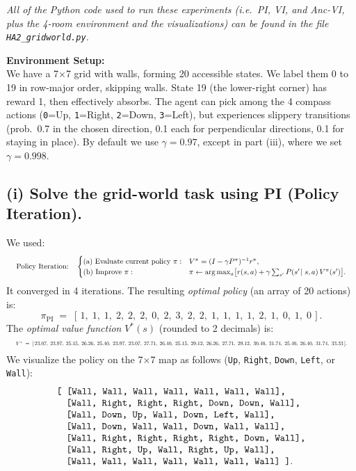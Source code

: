 \emph{All of the Python code used to run these experiments (i.e.\ PI, VI, and Anc-VI, 
plus the 4-room environment and the visualizations) can be found in the file 
\texttt{HA2\_gridworld.py}.}

\bigskip

\noindent
\textbf{Environment Setup:}\\
We have a 7$\times$7 grid with walls, forming 20 accessible states. 
We label them 0 to 19 in row-major order, skipping walls. 
State 19 (the lower-right corner) has reward 1, then effectively absorbs. 
The agent can pick among the 4 compass actions 
(\texttt{0}=Up, \texttt{1}=Right, \texttt{2}=Down, \texttt{3}=Left), 
but experiences slippery transitions (prob.\ 0.7 in the chosen direction, 0.1 each 
for perpendicular directions, 0.1 for staying in place). 
By default we use $\gamma=0.97$, except in part (iii), where we set $\gamma=0.998$.

\subsection*{(i) Solve the grid-world task using PI (Policy Iteration).}

\noindent
We used:
\[
  \resizebox{\textwidth}{!}{
  $\text{Policy Iteration:}\quad
  \begin{cases}
    \text{(a) Evaluate current policy }\pi: 
      & V^\pi = (I - \gamma P^\pi)^{-1} r^\pi,\\
    \text{(b) Improve } \pi: & 
      \pi \leftarrow \arg\max_{a} 
        \bigl[r(s,a)+\gamma\sum_{s'}P(s'\!\mid s,a)\,V^\pi(s')\bigr].
  \end{cases}$
  }
\]
It converged in 4 iterations. 
The resulting \emph{optimal policy} (an array of 20 actions) is:
\[
  \pi_{\mathrm{PI}} \;=\; 
  [\,1,\;1,\;1,\;2,\;2,\;2,\;0,\;2,\;3,\;2,\;2,\;1,\;1,\;1,\;1,\;2,\;1,\;0,\;1,\;0\,].
\]
The \emph{optimal value function} $V^*(s)$ (rounded to 2 decimals) is:
\[
  \resizebox{\textwidth}{!}{
  $V^* \;=\;
  [\,23.07,\;23.97,\;25.15,\;26.26,\;25.40,\;23.97,\;23.07,\;27.71,\;26.40,\;25.15,\;
    29.12,\;26.26,\;27.71,\;29.12,\;30.40,\;31.74,\;25.40,\;26.40,\;31.74,\;33.33\,].$
 }
\]
We visualize the policy on the 7$\times$7 map as follows 
(\texttt{Up}, \texttt{Right}, \texttt{Down}, \texttt{Left}, or \texttt{Wall}):
\[
\begin{array}{l}
\text{\ttfamily
[ [Wall,  Wall,  Wall,  Wall,  Wall,  Wall,  Wall],}\\
\quad \text{\ttfamily [Wall, Right, Right, Right, Down, Down, Wall],}\\
\quad \text{\ttfamily [Wall, Down,  Up,   Wall, Down, Left, Wall],}\\
\quad \text{\ttfamily [Wall, Down,  Wall, Wall, Down, Wall, Wall],}\\
\quad \text{\ttfamily [Wall, Right, Right, Right, Right, Down, Wall],}\\
\quad \text{\ttfamily [Wall, Right, Up,    Wall, Right, Up,   Wall],}\\
\quad \text{\ttfamily [Wall, Wall,  Wall,  Wall, Wall, Wall, Wall] ]}.
\end{array}
\]

